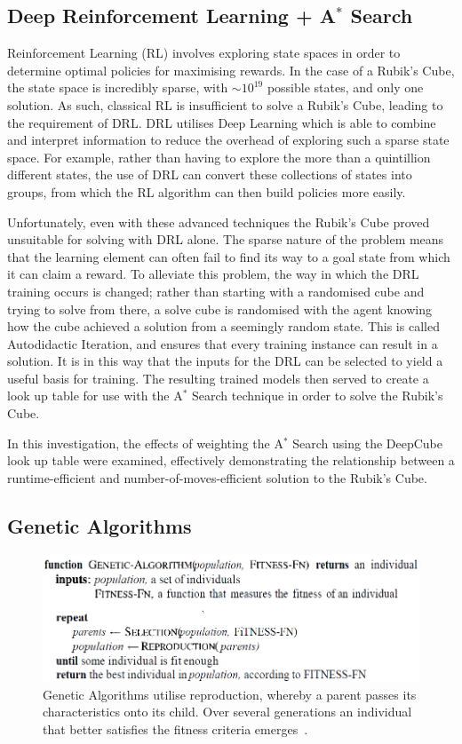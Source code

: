 \documentclass[UKenglish]{libraries/svproc}
\begin{document}
\subsection{Deep Reinforcement Learning + A$^{\ast}$ Search}
Reinforcement Learning (RL) involves exploring state spaces in order to determine optimal policies for maximising rewards. In the case of a Rubik's Cube, the state space is incredibly sparse, with $\sim 10^{19}$ possible states, and only one solution. As such, classical RL is insufficient to solve a Rubik's Cube, leading to the requirement of DRL. DRL utilises Deep Learning which is able to combine and interpret information to reduce the overhead of exploring such a sparse state space. For example, rather than having to explore the more than a quintillion different states, the use of DRL can convert these collections of states into groups, from which the RL algorithm can then build policies more easily. \par Unfortunately, even with these advanced techniques the Rubik's Cube proved unsuitable for solving with DRL alone. The sparse nature of the problem means that the learning element can often fail to find its way to a goal state from which it can claim a reward. To alleviate this problem, the way in which the DRL training occurs is changed; rather than starting with a randomised cube and trying to solve from there, a solve cube is randomised with the agent knowing how the cube achieved a solution from a seemingly random state. This is called Autodidactic Iteration, and ensures that every training instance can result in a solution. It is in this way that the inputs for the DRL can be selected to yield a useful basis for training. The resulting trained models then served to create a look up table for use with the A$^{\ast}$ Search technique in order to solve the Rubik's Cube. \par In this investigation, the effects of weighting the A$^{\ast}$ Search using the DeepCube look up table were examined, effectively demonstrating the relationship between a runtime-efficient and number-of-moves-efficient solution to the Rubik's Cube.

\subsection{Genetic Algorithms}

\begin{figure}[!h]
\begin{small}
\centering
\linespread{1.0}
\includegraphics[width=0.75\linewidth]{images/genetic algorithm}
\caption{Genetic Algorithms utilise reproduction, whereby a parent passes its characteristics onto its child. Over several generations an individual that better satisfies the fitness criteria emerges~\cite{10.5555/1671238}.}
\label{fig:fig0}
\end{small}
\end{figure}
\end{document}
